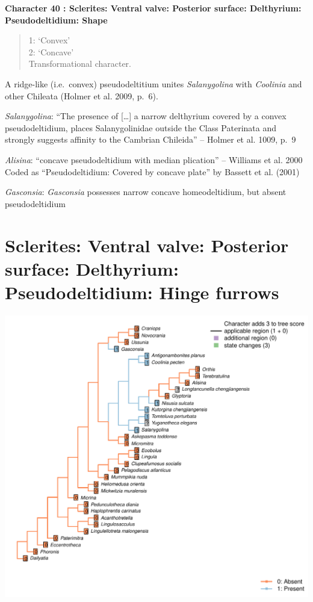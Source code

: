 \documentclass[]{book}
\theoremstyle{definition}
\theoremstyle{definition}
\theoremstyle{definition}
\theoremstyle{remark}
\begin{document}
\textbf{Character 40 : Sclerites: Ventral valve: Posterior surface:
Delthyrium: Pseudodeltidium: Shape }

\begin{quote}
1: `Convex'\\
2: `Concave'\\
Transformational character.
\end{quote}

A ridge-like (i.e.~convex) pseudodeltitium unites \emph{Salanygolina}
with \emph{Coolinia} and other Chileata (Holmer et al. 2009, p.~6).

\emph{Salanygolina}: ``The presence of {[}\ldots{}{]} a narrow
delthyrium covered by a convex pseudodeltidium, places Salanygolinidae
outside the Class Paterinata and strongly suggests affinity to the
Cambrian Chileida'' -- Holmer et al. 1009, p.~9

\emph{Alisina}: ``concave pseudodeltidium with median plication'' --
Williams et al. 2000\\
Coded as ``Pseudodeltidium: Covered by concave plate'' by Bassett et al.
(2001)

\emph{Gasconsia}: \emph{Gasconsia} possesses narrow concave
homeodeltidium, but absent pseudodeltidium

\hypertarget{sclerites-ventral-valve-posterior-surface-delthyrium-pseudodeltidium-hinge-furrows}{%
\section*{Sclerites: Ventral valve: Posterior surface: Delthyrium:
Pseudodeltidium: Hinge
furrows}\label{sclerites-ventral-valve-posterior-surface-delthyrium-pseudodeltidium-hinge-furrows}}

\includegraphics{Brachiopod_phylogeny_files/figure-latex/unnamed-chunk-5-41.pdf}
\end{document}
